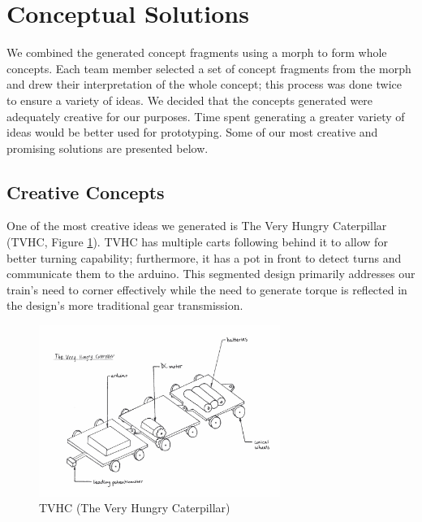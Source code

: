 \documentclass[class=../report, crop=false]{standalone}
\begin{document}
\section{Conceptual Solutions}

We combined the generated concept fragments using a \gls{morph} to form whole concepts.
Each team member selected a set of concept fragments from the \gls{morph} and drew their interpretation of the whole concept; this process was done twice to ensure a variety of ideas.
We decided that the concepts generated were adequately creative for our purposes.
Time spent generating a greater variety of ideas would be better used for prototyping. Some of our most creative and promising solutions are presented below\footnotemark.



\subsection{Creative Concepts}

One of the most creative ideas we generated is The Very Hungry Caterpillar (TVHC, Figure \ref{fig:tvhc}).
TVHC has multiple carts following behind it to allow for better turning capability; furthermore, it has a \gls{pot} in front to detect turns and communicate them to the \gls{arduino}.
This segmented design primarily addresses our train’s need to corner effectively while the need to generate \gls{torque} is reflected in the design’s more traditional gear transmission.

\begin{figure}[H]
	\centering
	\includegraphics[width=0.7\textwidth]{../res/img/tvhc}
	\caption{TVHC (The Very Hungry Caterpillar)}
	\label{fig:tvhc}
\end{figure}
\end{document}
